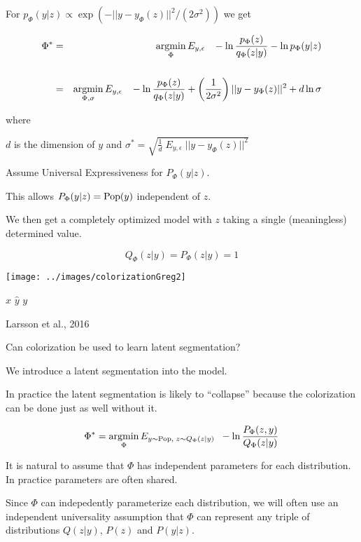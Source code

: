 {For $p_\Phi(y|z) \propto \exp(-||y - y_\Phi(z)||^2/(2\sigma^2))$ we get

\begin{eqnarray*}
\Phi^* & = & \operatorname*{argmin}_{\Phi} E_{y,\epsilon}\;\;\;-\ln \frac{p_\Phi(z)}{q_\Phi(z|y)} - \ln p_\Phi(y|z) \\
\\
       & = & \operatorname*{argmin}_{\Phi,\sigma} E_{y,\epsilon}\;\;\;-\ln \frac{p_\Phi(z)}{q_\Phi(z|y)} +\left(\frac{1}{2\sigma^2}\right)||y - y_\Phi(z)||^2 + d\ln \sigma
\end{eqnarray*}

\vfill
where

\centerline{$d$ is the dimension of $y$ and $\sigma^*  =  \sqrt{\frac{1}{d}\;E_{y,\epsilon}\; ||y - y_\Phi(z)||^2}$}


Assume Universal Expressiveness for $P_\Phi(y|z)$.

\vfill
This allows $P_\Phi(y|z) = \mathrm{Pop}(y)$ independent of $z$.

\vfill
We then get a completely optimized model with $z$ taking a single (meaningless) determined value.

\vfill
$$Q_\Phi(z|y) = P_\Phi(z|y) = 1$$

\medskip
\centerline{\texttt{[image: ../images/colorizationGreg2]}}
\centerline{$x$ \hspace{4em} $\hat{y}$ \hspace{4em} $y$}
\centerline{\huge Larsson et al., 2016}

\vfill
Can colorization be used to learn latent segmentation?

\vfill
We introduce a latent segmentation into the model.

\vfill
In practice the latent segmentation is likely to ``collapse'' because the colorization can be done just as well without it.



$$\Phi^* = \operatorname*{argmin}_\Phi E_{y\sim \mathrm{Pop},\;z \sim Q_\Phi(z|y)}\;\;-\ln \frac{P_\Phi(z,y)}{Q_\Phi(z|y)}$$

\vfill
It is natural to assume  that $\Phi$ has independent parameters for each distribution.  In practice parameters are often shared.

\vfill
Since $\Phi$ can indepedently parameterize each distribution, we will often use an independent universality assumption
that $\Phi$ can represent any triple of distributions $Q(z|y)$, $P(z)$ and $P(y|z)$.


}
